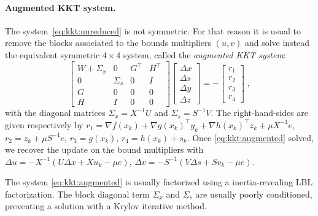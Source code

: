 \paragraph{Augmented KKT system.}
The system~\eqref{eq:kkt:unreduced} is not symmetric. For
that reason it is usual to remove the blocks associated
to the bounds multipliers $(u, v)$ and solve instead the equivalent
symmetric $4 \times 4$ system, called the \emph{augmented KKT system}:
\begin{equation}
  \label{eq:kkt:augmented}
  \tag{$K_2$}
  \begin{bmatrix}
    W + \Sigma_x & 0 & G^\top & H^\top \\
    0 & \Sigma_s & 0& I \\
    G & 0 & 0 & 0 \\
    H & I & 0 & 0
  \end{bmatrix}
  \begin{bmatrix}
    \Delta x \\
    \Delta s \\
    \Delta y \\
    \Delta z
  \end{bmatrix}
  = - \begin{bmatrix}
    r_1 \\ r_2 \\ r_3 \\ r_4
  \end{bmatrix} \; ,
\end{equation}
with the diagonal matrices $\Sigma_x = X^{-1} U$ and $\Sigma_s = S^{-1} V$.
The right-hand-sides are given respectively by
$r_1 = \nabla f(x_k) + \nabla g(x_k)^\top y_k + \nabla h(x_k)^\top z_k + \mu X^{-1} e$,
$r_2 = z_k + \mu S^{-1} e$,
$r_3 = g(x_k)$,
$r_4 = h(x_k) + s_k$.
Once \eqref{eq:kkt:augmented} solved, we recover the
update on the bound multipliers with
$\Delta u = - X^{-1}(U \Delta x + X u_k - \mu e)$,
$\Delta v = - S^{-1}(V \Delta s + S v_k - \mu e)$.

The system \eqref{eq:kkt:augmented} is usually factorized using
a inertia-revealing LBL factorization. The block diagonal term
$\Sigma_x$ and $\Sigma_s$ are usually poorly conditioned, preventing
a solution with a Krylov iterative method.

